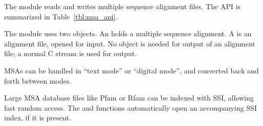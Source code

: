 The  module reads and writes multiple sequence alignment
files. The API is summarized in Table~\ref{tbl:msa_api}.

The module uses two objects. An  holds a multiple
sequence alignment. A  is an alignment file,
opened for input. No object is needed for output of an alignment file;
a normal C  stream is used for output.  

MSAs can be handled in ``text mode'' or ``digital mode'', and
converted back and forth between modes.

Large MSA database files like Pfam or Rfam can be indexed with SSI,
allowing fast random access.  The  and
 functions automatically open an
accompanying SSI index, if it is present.

